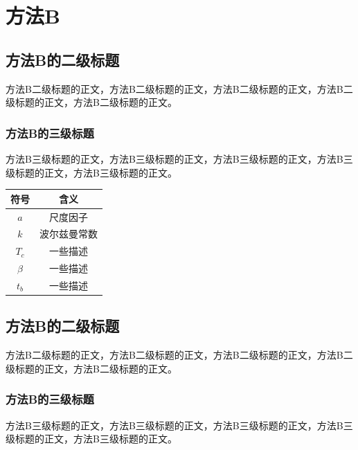 \section{方法B\label{方法B}}


\subsection{方法B的二级标题}

方法B二级标题的正文，方法B二级标题的正文，方法B二级标题的正文，方法B二级标题的正文，方法B二级标题的正文。

\subsubsection{方法B的三级标题}

方法B三级标题的正文，方法B三级标题的正文，方法B三级标题的正文，方法B三级标题的正文，方法B三级标题的正文。


\begin{table}[htb]
    \centering
    \captionsetup{font=footnotesize}
    \label{tab:符号对照表B}
    \begin{tabular}{@{}cc@{}}
        \toprule
        符号     & 含义       \\ 
        \midrule
        $a$     & 尺度因子    \\
        $k$     & 波尔兹曼常数 \\
        $T_c$   & 一些描述    \\
        $\beta$ & 一些描述    \\
        $t_b$   & 一些描述    \\
        \bottomrule
    \end{tabular}
\end{table}

\subsection{方法B的二级标题}

方法B二级标题的正文，方法B二级标题的正文，方法B二级标题的正文，方法B二级标题的正文，方法B二级标题的正文。

\subsubsection{方法B的三级标题}

方法B三级标题的正文，方法B三级标题的正文，方法B三级标题的正文，方法B三级标题的正文，方法B三级标题的正文。